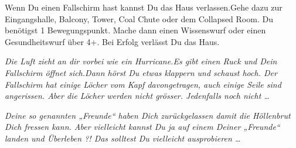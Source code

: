 \newpage


Wenn Du einen Fallschirm hast kannst Du das Haus verlassen.Gehe dazu zur Eingangshalle,
Balcony, Tower, Coal Chute oder dem Collapsed Room. Du benötigst 1 Bewegungspunkt.
Mache dann einen Wissenswurf oder einen Gesundheitswurf über 4+. Bei Erfolg verlässt Du das Haus.

{\itshape
Die Luft zieht an dir vorbei wie ein Hurricane.Es gibt einen Ruck und Dein Fallschirm öffnet sich.Dann hörst Du etwas klappern und schaust hoch. Der Fallschirm hat einige Löcher vom Kapf davongetragen, auch einige Seile sind angerissen. Aber die Löcher werden nicht grösser. Jedenfalls noch nicht …
}

{ \itshape Deine so genannten „Freunde“ haben Dich zurückgelassen damit die Höllenbrut Dich fressen kann. Aber vielleicht kannst Du ja auf einem Deiner „Freunde“ landen und Überleben ?! Das solltest Du vielleicht ausprobieren … }